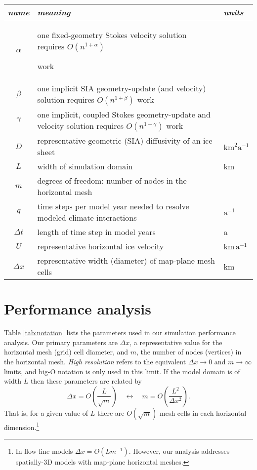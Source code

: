 \documentclass[twocolumn,letterpaper]{igs}
\begin{document}
\begin{table*}[ht]
{\normalsize
\begin{tabular}{cll}
\emph{name} & \emph{meaning} & \emph{units} \\ \hline
$\alpha$    & one fixed-geometry Stokes velocity solution requires $O(n^{1+\alpha})${\large \strut} work\\
$\beta$     & one implicit SIA geometry-update (and velocity) solution requires $O(n^{1+\beta})$ work \\
$\gamma$    & one implicit, coupled Stokes geometry-update and velocity solution requires $O(n^{1+\gamma})$ work \\
$D$         & representative geometric (SIA) diffusivity of an ice sheet & $\text{km}^2 \text{a}^{-1}$ \\
$L$         & width of simulation domain & km \\
$m$         & degrees of freedom: number of nodes in the horizontal mesh \\
$q$         & time steps per model year needed to resolve modeled climate interactions & $\text{a}^{-1}$ \\
$\Delta t$  & length of time step in model years & a \\
$U$         & representative horizontal ice velocity & $\text{km}\,\text{a}^{-1}$ \\
$\Delta x$  & representative width (diameter) of map-plane mesh cells & km
\end{tabular}
}
\caption{Parameters for performance analysis; $\alpha,\beta,\gamma,n$ are pure numbers.}
\label{tab:notation}
\end{table*}


\section{Performance analysis}

Table \ref{tab:notation} lists the parameters used in our simulation performance  analysis.  Our primary parameters are $\Delta x$, a representative value for the horizontal mesh (grid) cell diameter, and $m$, the number of nodes (vertices) in the horizontal mesh.  \emph{High resolution} refers to the equivalent $\Delta x\to 0$ and $m\to\infty$ limits, and big-O notation is only used in this limit.  If the model domain is of width $L$ then these parameters are related by
\begin{equation}
\Delta x = O\left(\frac{L}{\sqrt{m}}\right) \quad \leftrightarrow \quad m = O\left(\frac{L^2}{\Delta x^2}\right).  \label{eq:paramrelation}
\end{equation}
That is, for a given value of $L$ there are $O(\sqrt{m})$ mesh cells in each horizontal dimension.\footnote{In flow-line models $\Delta x = O(L m^{-1})$.  However, our analysis addresses spatially-3D models with map-plane horizontal meshes.}
\end{document}
